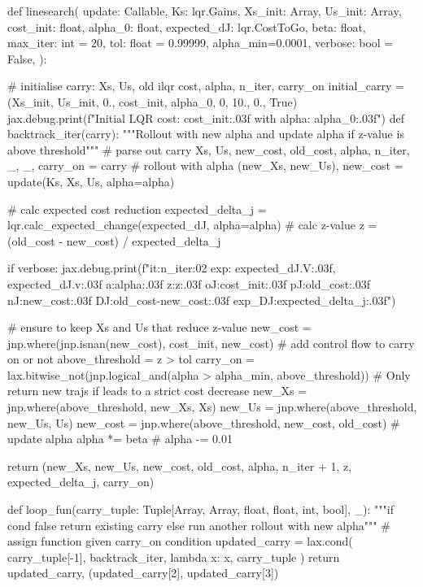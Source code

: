 

def linesearch(
    update: Callable,
    Ks: lqr.Gains,
    Xs_init: Array,
    Us_init: Array,
    cost_init: float,
    alpha_0: float,
    expected_dJ: lqr.CostToGo,
    beta: float,
    max_iter: int = 20,
    tol: float = 0.99999,
    alpha_min=0.0001,
    verbose: bool = False,
):
    
    # initialise carry: Xs, Us, old ilqr cost, alpha, n_iter, carry_on
    initial_carry = (Xs_init, Us_init, 0., cost_init, alpha_0, 0, 10., 0., True)
    jax.debug.print(f"Initial LQR cost: {cost_init:.03f} with alpha: {alpha_0:.03f}")
    def backtrack_iter(carry):
        """Rollout with new alpha and update alpha if z-value is above threshold"""
        # parse out carry
        Xs, Us, new_cost, old_cost, alpha, n_iter, _, _, carry_on = carry
        # rollout with alpha
        (new_Xs, new_Us), new_cost = update(Ks, Xs, Us, alpha=alpha)

        # calc expected cost reduction
        expected_delta_j = lqr.calc_expected_change(expected_dJ, alpha=alpha)
        # calc z-value
        z = (old_cost - new_cost) / expected_delta_j
        
        if verbose:
            jax.debug.print(f"it:{n_iter:02} exp: {expected_dJ.V:.03f}, {expected_dJ.v:.03f} a:{alpha:.03f} z:{z:.03f} oJ:{cost_init:.03f} pJ:{old_cost:.03f} nJ:{new_cost:.03f} DJ:{old_cost-new_cost:.03f} exp_DJ:{expected_delta_j:.03f}")

        # ensure to keep Xs and Us that reduce z-value
        new_cost = jnp.where(jnp.isnan(new_cost), cost_init, new_cost)
        # add control flow to carry on or not
        above_threshold = z > tol
        carry_on = lax.bitwise_not(jnp.logical_and(alpha > alpha_min, above_threshold))
        # Only return new trajs if leads to a strict cost decrease
        new_Xs = jnp.where(above_threshold, new_Xs, Xs)
        new_Us = jnp.where(above_threshold, new_Us, Us)
        new_cost = jnp.where(above_threshold, new_cost, old_cost)
        # update alpha
        alpha *= beta
        # alpha -= 0.01

        return (new_Xs, new_Us, new_cost, old_cost, alpha, n_iter + 1, z, expected_delta_j, carry_on)

    def loop_fun(carry_tuple: Tuple[Array, Array, float, float, int, bool], _):
        """if cond false return existing carry else run another rollout with new alpha"""
        # assign function given carry_on condition
        updated_carry = lax.cond(
            carry_tuple[-1], backtrack_iter, lambda x: x, carry_tuple
        )
        return updated_carry, (updated_carry[2], updated_carry[3])

